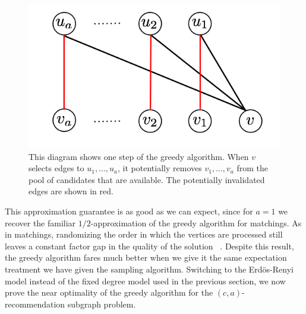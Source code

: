 \begin{figure}[H]
\centering
\includegraphics[width=.39\textwidth]{images/greedy.png}
\caption{This diagram shows one step of the greedy algorithm. When $v$ selects edges to $u_1,\ldots, u_a$, it potentially removes $v_1,\ldots, v_a$ from the pool of candidates that are available. The potentially invalidated edges are shown in red.}
\end{figure}

This approximation guarantee is as good as we can expect,
since for $a=1$ we recover the familiar $1/2$-approximation
of the greedy algorithm for matchings. As in matchings,
randomizing the order in which the vertices are processed still
leaves a constant factor gap in the quality of the solution
~\cite{KarpVaziraniVazirani1990}. Despite this result, the greedy
algorithm fares much better when we give it the same expectation
treatment we have given the sampling algorithm. Switching to the
Erd\"{o}s-Renyi model instead of the fixed degree model used in
the previous section, we now prove the near optimality of the
greedy algorithm for the $(c, a)$-recommendation subgraph problem.

